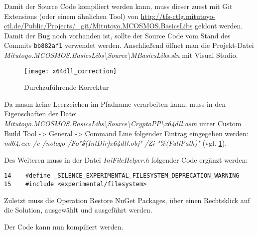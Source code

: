 Damit der Source Code kompiliert werden kann, muss dieser zuest mit Git Extensions (oder einem ähnlichen Tool) von
\url{http://tfs-ctlg.mitutoyo-ctl.de/Public/Projects/_git/Mitutoyo.MCOSMOS.BasicsLibs} geklont werden. Damit der Bug noch vorhanden ist, sollte der Source Code vom Stand des
Commits \verb|bb882af1| verwendet werden. \newline
Anschließend öffnet man die Projekt-Datei \textit{Mitutoyo.MCOSMOS.BasicsLibs\textbackslash Source\textbackslash MBa\allowbreak sicsLibs.sln} mit Visual Studio.

\begin{figure}[htpb]
    \centering
    \texttt{[image: x64dll\_correction]}
    \caption{Durchzuführende Korrektur}
    \label{img:x64dll_correction}
\end{figure}

Da \gls{masm} keine Leerzeichen im Pfadname verarbeiten kann, muss in den Eigenschaften der Datei
\textit{Mitutoyo.MCOSMOS.BasicsLibs\textbackslash Source\textbackslash CryptoPP\textbackslash x64dll.asm} unter \glqq{}Custom Build Tool\grqq{}
-> \glqq{}General\grqq{} -> \glqq{}Command Line\grqq{} folgender Eintrag eingegeben werden: \textit{ml64.exe /c /nologo /Fo"\$(IntDir)x64dll.obj" /Zi "\%(FullPath)"}
(vgl. \ref{img:x64dll_correction}).

Des Weiteren muss in der Datei \textit{IniFileHelper.h} folgender Code ergänzt werden:
\begin{lstlisting}
14    #define _SILENCE_EXPERIMENTAL_FILESYSTEM_DEPRECATION_WARNING
15    #include <experimental/filesystem>
\end{lstlisting}

Zuletzt muss die Operation \glqq{}Restore NuGet Packages\grqq{}, über einen Rechtsklick auf die Solution, ausgewählt und ausgeführt werden.

Der Code kann nun kompiliert werden.
